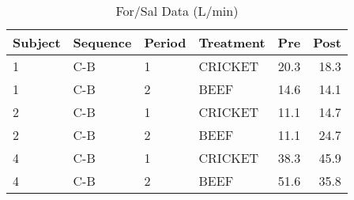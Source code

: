 \begin{table}

\caption{\label{tab:forSalData}For/Sal Data (L/min)}
\centering
\begin{tabular}[t]{llllrr}
\toprule
Subject & Sequence & Period & Treatment & Pre & Post\\
\midrule
1 & C-B & 1 & CRICKET & 20.3 & 18.3\\
1 & C-B & 2 & BEEF & 14.6 & 14.1\\
2 & C-B & 1 & CRICKET & 11.1 & 14.7\\
2 & C-B & 2 & BEEF & 11.1 & 24.7\\
4 & C-B & 1 & CRICKET & 38.3 & 45.9\\
4 & C-B & 2 & BEEF & 51.6 & 35.8\\
\bottomrule
\end{tabular}
\end{table}
